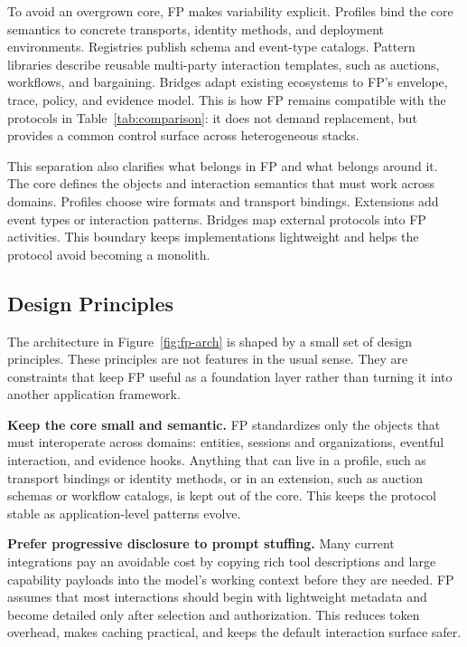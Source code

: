\documentclass{llmxive}
\begin{document}
To avoid an overgrown core, FP makes variability explicit. Profiles bind the core semantics to concrete transports, identity methods, and deployment environments. Registries publish schema and event-type catalogs. Pattern libraries describe reusable multi-party interaction templates, such as auctions, workflows, and bargaining. Bridges adapt existing ecosystems to FP's envelope, trace, policy, and evidence model. This is how FP remains compatible with the protocols in Table~\ref{tab:comparison}: it does not demand replacement, but provides a common control surface across heterogeneous stacks.

This separation also clarifies what belongs in FP and what belongs around it. The core defines the objects and interaction semantics that must work across domains. Profiles choose wire formats and transport bindings. Extensions add event types or interaction patterns. Bridges map external protocols into FP activities. This boundary keeps implementations lightweight and helps the protocol avoid becoming a monolith.


\subsection{Design Principles}
\label{subsec:principles}

The architecture in Figure~\ref{fig:fp-arch} is shaped by a small set of design principles. These principles are not features in the usual sense. They are constraints that keep FP useful as a foundation layer rather than turning it into another application framework.

\textbf{Keep the core small and semantic.} FP standardizes only the objects that must interoperate across domains: entities, sessions and organizations, eventful interaction, and evidence hooks. Anything that can live in a profile, such as transport bindings or identity methods, or in an extension, such as auction schemas or workflow catalogs, is kept out of the core. This keeps the protocol stable as application-level patterns evolve.

\textbf{Prefer progressive disclosure to prompt stuffing.} Many current integrations pay an avoidable cost by copying rich tool descriptions and large capability payloads into the model's working context before they are needed. FP assumes that most interactions should begin with lightweight metadata and become detailed only after selection and authorization. This reduces token overhead, makes caching practical, and keeps the default interaction surface safer.
\end{document}
